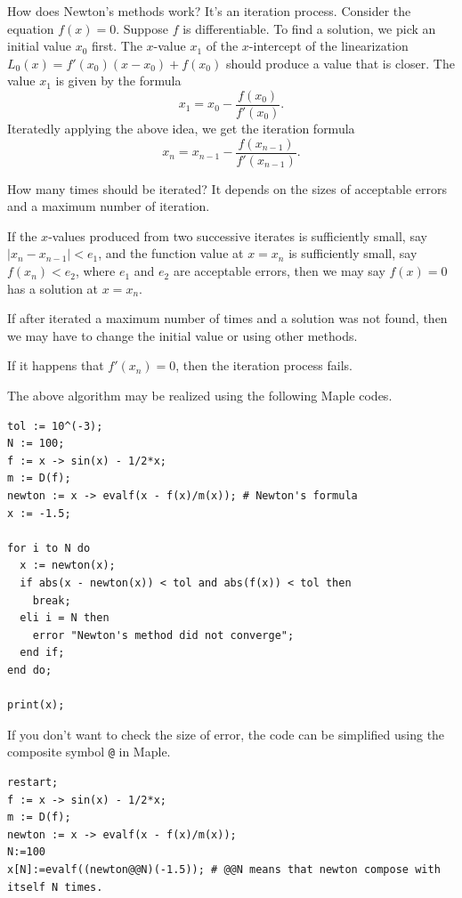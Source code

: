 \documentclass[
  en,11pt,simple]{elegantbook}
\begin{document}
How does Newton's methods work? It's an iteration process. Consider the equation \(f(x)=0\). Suppose \(f\) is differentiable. To find a solution, we pick an initial value \(x_0\) first. The \(x\)-value \(x_1\) of the \(x\)-intercept of the linearization \(L_0(x)=f'(x_0)(x-x_0)+f(x_0)\) should produce a value that is closer. The value \(x_1\) is given by the formula
\[
x_1=x_0-\frac{f(x_0)}{f'(x_0)}.
\]
Iteratedly applying the above idea, we get the iteration formula
\[
x_{n}=x_{n-1}-\frac{f(x_{n-1})}{f'(x_{n-1})}.
\]

\begin{remark}
{}
How many times should be iterated? It depends on the sizes of acceptable errors and a maximum number of iteration.

If the \(x\)-values produced from two successive iterates is sufficiently small, say \(|x_n-x_{n-1}|<e_1\), and the function value at \(x=x_n\) is sufficiently small, say \(f(x_n)<e_2\), where \(e_1\) and \(e_2\) are acceptable errors, then we may say \(f(x)=0\) has a solution at \(x=x_n\).

If after iterated a maximum number of times and a solution was not found, then we may have to change the initial value or using other methods.

If it happens that \(f'(x_n) = 0\), then the iteration process fails.

The above algorithm may be realized using the following Maple codes.

\begin{verbatim}
tol := 10^(-3);
N := 100;
f := x -> sin(x) - 1/2*x;
m := D(f);
newton := x -> evalf(x - f(x)/m(x)); # Newton's formula
x := -1.5;

for i to N do
  x := newton(x);
  if abs(x - newton(x)) < tol and abs(f(x)) < tol then
    break;
  eli i = N then
    error "Newton's method did not converge";
  end if;
end do;

print(x);
\end{verbatim}

If you don't want to check the size of error, the code can be simplified using the composite symbol \texttt{@} in Maple.

\begin{verbatim}
restart;
f := x -> sin(x) - 1/2*x;
m := D(f);
newton := x -> evalf(x - f(x)/m(x));
N:=100
x[N]:=evalf((newton@@N)(-1.5)); # @@N means that newton compose with itself N times.
\end{verbatim}
\end{remark}
\end{document}
